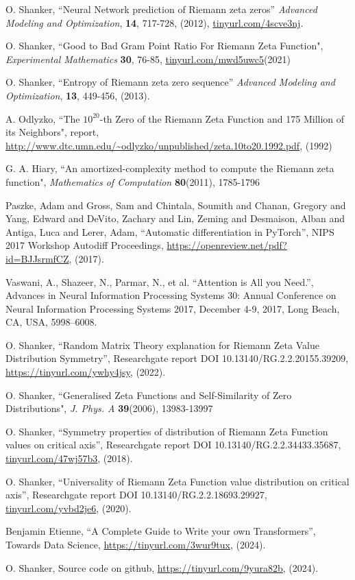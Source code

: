 \documentclass[twoside]{article}
\begin{document}

\begin{thebibliography}{10}

 O. Shanker, ``Neural Network prediction of Riemann zeta zeros''
{\it Advanced Modeling and Optimization}, {\bf 14}, 717-728, (2012), \url{tinyurl.com/4scve3nj}.


 O. Shanker, 
``Good to Bad Gram Point Ratio For Riemann Zeta Function",
{\it Experimental Mathematics} {\bf 30}, 76-85,
\url{tinyurl.com/mwd5uwc5}(2021)

 O. Shanker, ``Entropy of Riemann zeta zero sequence''
{\it Advanced Modeling and Optimization}, {\bf 13}, 449-456, (2013). 

  A. Odlyzko,
``The $10^{20}$-th Zero of the Riemann Zeta
Function and 175 Million of its Neighbors", report,
\url{http://www.dtc.umn.edu/~odlyzko/unpublished/zeta.10to20.1992.pdf}, (1992)

 G. A. Hiary,
``An amortized-complexity method to compute the Riemann zeta function", 
{\it Mathematics of Computation} {\bf80}(2011), 1785-1796


 Paszke, Adam and Gross, Sam and Chintala, Soumith and Chanan, Gregory and Yang, Edward and DeVito, Zachary and Lin, Zeming and Desmaison, Alban and Antiga, Luca and Lerer, Adam, 
``Automatic differentiation in PyTorch'',
 NIPS 2017 Workshop Autodiff Proceedings,
\url{https://openreview.net/pdf?id=BJJsrmfCZ}, 
(2017). 

 Vaswani, A., Shazeer, N., Parmar, N., et al. 
``Attention is All you Need.'', 
Advances in Neural Information Processing Systems 30: Annual Conference                    on Neural Information Processing Systems 2017, December 4-9, 2017,  Long Beach, CA, USA, 5998--6008.

 O. Shanker, 
``Random Matrix Theory explanation for Riemann Zeta Value Distribution Symmetry'',
 Researchgate report DOI 10.13140/RG.2.2.20155.39209,
\url{https://tinyurl.com/ywhy4jsy}, 
(2022). 


 O. Shanker, 
``Generalised Zeta Functions and Self-Similarity of Zero Distributions",
{\it J.  Phys. A} {\bf39}(2006), 13983-13997

 O. Shanker, 
``Symmetry properties of distribution of Riemann Zeta Function values on critical axis'',
 Researchgate report DOI 10.13140/RG.2.2.34433.35687,
\url{tinyurl.com/47wj57b3}, 
(2018). 

 O. Shanker, 
``Universality of Riemann Zeta Function value distribution on critical axis'',
 Researchgate report DOI 10.13140/RG.2.2.18693.29927,
\url{tinyurl.com/yvbd2je6}, 
(2020). 

 Benjamin Etienne, 
``A Complete Guide to Write your own Transformers'',
 Towards Data Science,
\url{https://tinyurl.com/3wur9tux}, 
(2024). 

 O. Shanker, 
Source code on github,
\url{https://tinyurl.com/9yura82b}, 
(2024). 



\end{thebibliography} 
\end{document}
